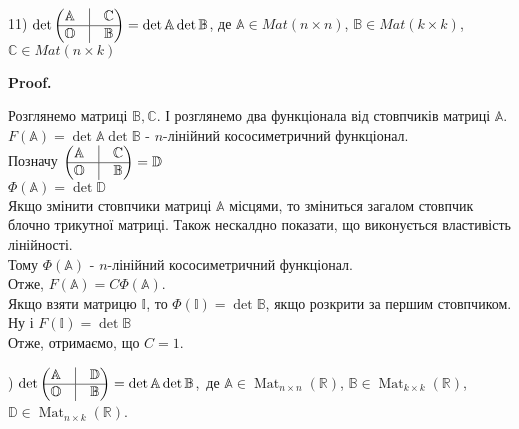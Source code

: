 \documentclass[a4paper, 10pt]{article}
\makeatletter
\theoremstyle{theoremdd}
\DeclareMathOperator{\Mat}{Mat}
\renewenvironment{proof}[1][Proof.\\]{\par
\pushQED{\hfill \qed}%
\normalfont \topsep6\p@\@plus6\p@\relax
\trivlist
\item\relax
{\bfseries
#1\@addpunct{.}}\hspace\labelsep\ignorespaces
}{%
\popQED\endtrivlist\@endpefalse
}
\makeatother
\begin{document}
11) $\det \begin{pmatrix}
 \mathbb{A} & \vline & \mathbb{C} \\
 \hline
 \mathbb{O} & \vline & \mathbb{B}
\end{pmatrix} = \det \mathbb{A} \det \mathbb{B}$, де $\mathbb{A} \in Mat(n \times n)$, $\mathbb{B} \in Mat(k \times k)$, $\mathbb{C} \in Mat(n \times k)$
\begin{proof}
Розглянемо матриці $\mathbb{B}, \mathbb{C}$. І розглянемо два функціонала від стовпчиків матриці $\mathbb{A}$.\\
$F(\mathbb{A}) = \det \mathbb{A} \det \mathbb{B}$ - $n$-лінійний кососиметричний функціонал.\\
Позначу $\begin{pmatrix}
 \mathbb{A} & \vline & \mathbb{C} \\
 \hline
 \mathbb{O} & \vline & \mathbb{B}
\end{pmatrix} = \mathbb{D}$\\
$\Phi(\mathbb{A}) = \det \mathbb{D}$\\
Якщо змінити стовпчики матриці $\mathbb{A}$ місцями, то зміниться загалом стовпчик блочно трикутної матриці. Також нескалдно показати, що виконується властивість лінійності.\\
Тому $\Phi(\mathbb{A})$ - $n$-лінійний кососиметричний функціонал.\\
Отже, $F(\mathbb{A}) = C\Phi(\mathbb{A})$.\\
Якщо взяти матрицю $\mathbb{I}$, то $\Phi(\mathbb{I}) = \det \mathbb{B}$, якщо розкрити за першим стовпчиком. Ну і $F(\mathbb{I}) = \det \mathbb{B}$\\
Отже, отримаємо, що $C = 1$.
\end{proof}
\fi

) $\det \begin{pmatrix}
 \mathbb{A} & \vline & \mathbb{D} \\
 \hline
 \mathbb{O} & \vline & \mathbb{B}
\end{pmatrix} = \det \mathbb{A} \det \mathbb{B}$,\ де $\mathbb{A} \in \Mat_{n \times n}(\mathbb{R})$, $\mathbb{B} \in \Mat_{k \times k}(\mathbb{R})$, $\mathbb{D} \in \Mat_{n \times k}(\mathbb{R})$.
\end{document}
